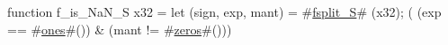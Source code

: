function f_is_NaN_S   x32 = {
  let (sign, exp, mant) = #\hyperref[sailRISCVzfsplitzyS]{fsplit\_S}# (x32);
  (  (exp == #\hyperref[sailRISCVzones]{ones}#())
   & (mant != #\hyperref[sailRISCVzzzeros]{zeros}#()))
}
